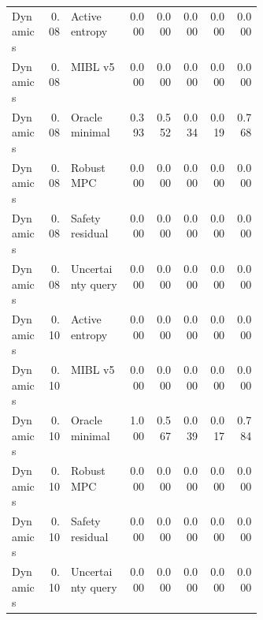 \documentclass{article}
\begin{document}
\begin{center}
\begin{longtable}{p{0.14\linewidth}rp{0.23\linewidth}rrrrr}
Dynamics & 0.08 & Active entropy & 0.000 & 0.000 & 0.000 & 0.000 & 0.000\\
Dynamics & 0.08 & MIBL v5 & 0.000 & 0.000 & 0.000 & 0.000 & 0.000\\
Dynamics & 0.08 & Oracle minimal & 0.393 & 0.552 & 0.034 & 0.019 & 0.768\\
Dynamics & 0.08 & Robust MPC & 0.000 & 0.000 & 0.000 & 0.000 & 0.000\\
Dynamics & 0.08 & Safety residual & 0.000 & 0.000 & 0.000 & 0.000 & 0.000\\
Dynamics & 0.08 & Uncertainty query & 0.000 & 0.000 & 0.000 & 0.000 & 0.000\\
Dynamics & 0.10 & Active entropy & 0.000 & 0.000 & 0.000 & 0.000 & 0.000\\
Dynamics & 0.10 & MIBL v5 & 0.000 & 0.000 & 0.000 & 0.000 & 0.000\\
Dynamics & 0.10 & Oracle minimal & 1.000 & 0.567 & 0.039 & 0.017 & 0.784\\
Dynamics & 0.10 & Robust MPC & 0.000 & 0.000 & 0.000 & 0.000 & 0.000\\
Dynamics & 0.10 & Safety residual & 0.000 & 0.000 & 0.000 & 0.000 & 0.000\\
Dynamics & 0.10 & Uncertainty query & 0.000 & 0.000 & 0.000 & 0.000 & 0.000\\
\bottomrule
\end{longtable}
\normalsize
\end{center}
\end{document}
